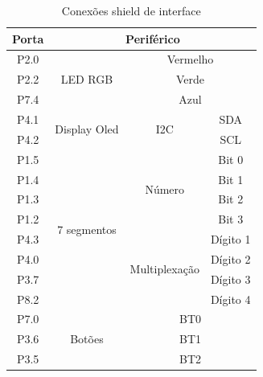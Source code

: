 \begin{table}[h!]
\centering
\begin{tabular}{|c|c|c|c|}
\hline
Porta & \multicolumn{3}{c|}{Periférico}                                           \\ \hline
P2.0  & \multirow{3}{*}{LED RGB}      & \multicolumn{2}{c|}{Vermelho}             \\ \cline{1-1} \cline{3-4} 
P2.2  &                               & \multicolumn{2}{c|}{Verde}                \\ \cline{1-1} \cline{3-4} 
P7.4  &                               & \multicolumn{2}{c|}{Azul}                 \\ \hline
P4.1  & \multirow{2}{*}{Display Oled} & \multirow{2}{*}{I2C}           & SDA      \\ \cline{1-1} \cline{4-4} 
P4.2  &                               &                                & SCL      \\ \hline
P1.5  & \multirow{8}{*}{7 segmentos}  & \multirow{4}{*}{Número}        & Bit 0    \\ \cline{1-1} \cline{4-4} 
P1.4  &                               &                                & Bit 1    \\ \cline{1-1} \cline{4-4} 
P1.3  &                               &                                & Bit 2    \\ \cline{1-1} \cline{4-4} 
P1.2  &                               &                                & Bit 3    \\ \cline{1-1} \cline{3-4} 
P4.3  &                               & \multirow{4}{*}{Multiplexação} & Dígito 1 \\ \cline{1-1} \cline{4-4} 
P4.0  &                               &                                & Dígito 2 \\ \cline{1-1} \cline{4-4} 
P3.7  &                               &                                & Dígito 3 \\ \cline{1-1} \cline{4-4} 
P8.2  &                               &                                & Dígito 4 \\ \hline
P7.0  & \multirow{3}{*}{Botões}       & \multicolumn{2}{c|}{BT0}                  \\ \cline{1-1} \cline{3-4} 
P3.6  &                               & \multicolumn{2}{c|}{BT1}                  \\ \cline{1-1} \cline{3-4} 
P3.5  &                               & \multicolumn{2}{c|}{BT2}                  \\ \hline
\end{tabular}
\caption{Conexões shield de interface}
\label{tab:interface}
\end{table}

